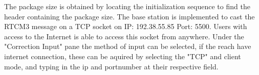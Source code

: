 The package size is obtained by locating the initialization sequence to find the header containing the package size.
The base station is implemented to cast the RTCM3 message on a TCP socket on IP: 192.38.55.85 Port: 5500. 
Users with access to the Internet is able to access this socket from anywhere.
Under the "Correction Input" pane the method of input can be selected, if the reach have internet connection, these can be aquired by selecting the "TCP" and client mode, and typing in the ip and portnumber at their respective field.



